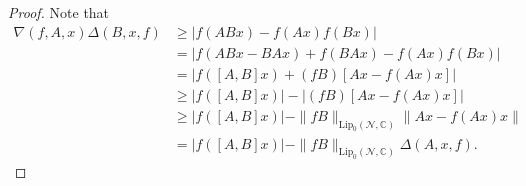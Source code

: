 \documentclass[10pt,a4paper]{amsart}
\begin{document}
\begin{proof}
	Note that 
	\begin{align*}
\nabla(f, A,x)\Delta (B, x, f)&\geq	|f(ABx)-f(Ax)f(Bx)|\\
&=|f(ABx-BAx)+f(BAx)-f(Ax)f(Bx)|\\
	&=|f([A,B]x)+(fB)[Ax-f(Ax)x]|\\
	&\geq |f([A,B]x)|-|(fB)[Ax-f(Ax)x]|\\
	&\geq |f([A,B]x)|-\|fB\|_{\text{Lip}_0(\mathcal{N}, \mathbb{C})}\|Ax-f(Ax)x\|\\
	&=|f([A,B]x)|-\|fB\|_{\text{Lip}_0(\mathcal{N}, \mathbb{C})}\Delta (A, x, f).
	\end{align*}
\end{proof}
\end{document}
